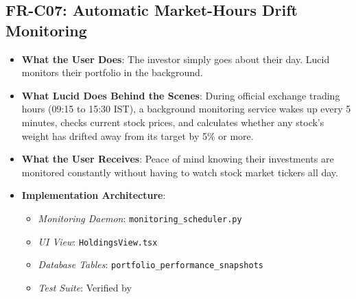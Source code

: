 \subsection{FR-C07: Automatic Market-Hours Drift Monitoring}
\begin{itemize}
    \item \textbf{What the User Does}: The investor simply goes about their day. Lucid monitors their portfolio in the background.
    \item \textbf{What Lucid Does Behind the Scenes}: During official exchange trading hours (09:15 to 15:30 IST), a background monitoring service wakes up every 5 minutes, checks current stock prices, and calculates whether any stock's weight has drifted away from its target by 5\% or more.
    \item \textbf{What the User Receives}: Peace of mind knowing their investments are monitored constantly without having to watch stock market tickers all day.
    \item \textbf{Implementation Architecture}:
    \begin{itemize}
        \item \textit{Monitoring Daemon}: \texttt{monitoring\_scheduler.py}
        \item \textit{UI View}: \texttt{HoldingsView.tsx}
        \item \textit{Database Tables}: \texttt{portfolio\_performance\_snapshots}
        \item \textit{Test Suite}: Verified by 
    \end{itemize}
\end{itemize}

